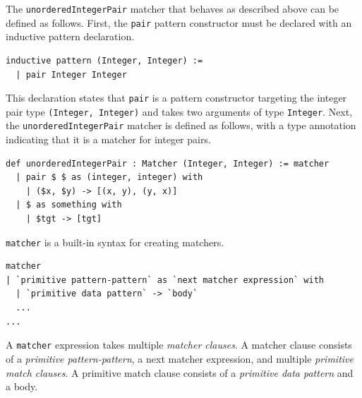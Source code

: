 The \lstinline{unorderedIntegerPair} matcher that behaves as described above can be defined as follows.
First, the \lstinline{pair} pattern constructor must be declared with an inductive pattern declaration.
\begin{lstlisting}[language=egison]
inductive pattern (Integer, Integer) :=
  | pair Integer Integer
\end{lstlisting}
This declaration states that \lstinline{pair} is a pattern constructor targeting the integer pair type \lstinline{(Integer, Integer)} and takes two arguments of type \lstinline{Integer}.
Next, the \lstinline{unorderedIntegerPair} matcher is defined as follows, with a type annotation indicating that it is a matcher for integer pairs.
\begin{lstlisting}[language=egison]
def unorderedIntegerPair : Matcher (Integer, Integer) := matcher
  | pair $ $ as (integer, integer) with
    | ($x, $y) -> [(x, y), (y, x)]
  | $ as something with
    | $tgt -> [tgt]
\end{lstlisting}
\lstinline{matcher} is a built-in syntax for creating matchers.
\begin{lstlisting}[language=egison,numbers=none]
matcher
| `primitive pattern-pattern` as `next matcher expression` with
  | `primitive data pattern` -> `body`
  ...
...
\end{lstlisting}
A \lstinline{matcher} expression takes multiple \emph{matcher clauses}.
A matcher clause consists of a \emph{primitive pattern-pattern}, a next matcher expression, and multiple \emph{primitive match clauses}.
A primitive match clause consists of a \emph{primitive data pattern} and a body.

